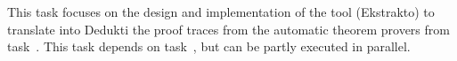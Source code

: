\begin{workpackage}
\begin{tasklist}
\begin{task}[id=tracetodedukti,
      title=Translate ATP traces into Dedukti,
      lead=Imt,
      LieRM=12,
      ImtRM=8,
      SacRM=2,
    ]
    This task focuses on the design and implementation of the tool (Ekstrakto)
    to translate into Dedukti the proof traces from the automatic theorem
    provers from task~.  This task depends on
    task~, but can be partly executed in
    parallel.





\end{task}
\end{tasklist}
\end{workpackage}
